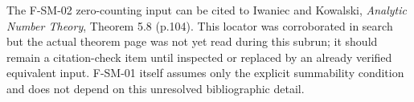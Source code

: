 \documentclass[11pt,a4paper]{article}
\theoremstyle{definition}\newtheorem{definition}[theorem]{Definition}
\theoremstyle{remark}\newtheorem{remark}[theorem]{Remark}
\begin{document}
The F-SM-02 zero-counting input can be cited to Iwaniec and Kowalski,
\emph{Analytic Number Theory}, Theorem 5.8 (p.104). This locator was
corroborated in search but the actual theorem page was not yet read
during this subrun; it should remain a citation-check item until
inspected or replaced by an already verified equivalent input. F-SM-01
itself assumes only the explicit summability condition and does not
depend on this unresolved bibliographic detail.
\end{document}
